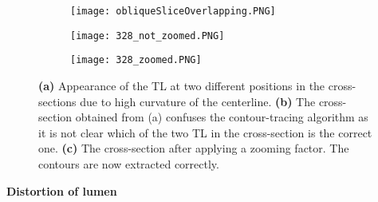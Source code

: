 \documentclass[thesis.tex]{subfiles}
\begin{document}
\begin{figure}
	\begin{subfigure}[t]{\textwidth}
		\texttt{[image: obliqueSliceOverlapping.PNG]}
		
	\caption{}	
\label{fig:overlappingCase}	
	\end{subfigure}
	\begin{subfigure}[t]{0.45\textwidth}
		\texttt{[image: 328\_not\_zoomed.PNG]}
			
\caption{}	
\label{fig:overlappingCrossection}	
	\end{subfigure}
\centering
\hspace{0.08\textwidth}
\begin{subfigure}[t]{0.45\textwidth}
		\texttt{[image: 328\_zoomed.PNG]}		
\caption{}	
\label{fig:overlappingCrosssectionZoomed}
	\end{subfigure}
	\caption{\textbf{(a)} Appearance of the TL at two different positions in the cross-sections due to high curvature of the centerline. \textbf{(b)} The cross-section obtained from (a) confuses the contour-tracing algorithm as it is not clear which of the two TL in the cross-section is the correct one. \textbf{(c)} The cross-section after applying a zooming factor. The contours are now extracted correctly.}
\label{fig:overlapping}
\end{figure}


\textbf{Distortion of lumen} 
\end{document}
